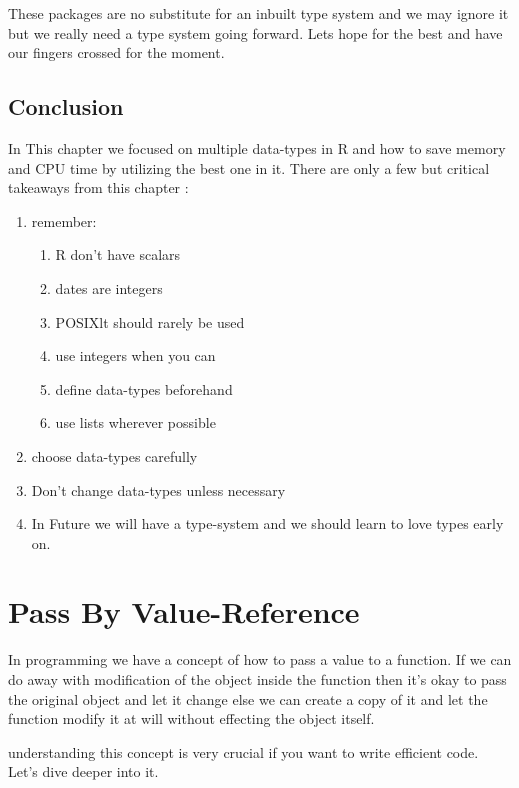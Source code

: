 \documentclass[
]{book}
\begin{document}
These packages are no substitute for an inbuilt type system and we may ignore it but we really need a type system going forward. Lets hope for the best and have our fingers crossed for the moment.

\hypertarget{conclusion-4}{%
\section{Conclusion}\label{conclusion-4}}

In This chapter we focused on multiple data-types in R and how to save memory and CPU time by utilizing the best one in it. There are only a few but critical takeaways from this chapter :

\begin{enumerate}
\def\labelenumi{\arabic{enumi}.}
\item
  remember:

  \begin{enumerate}
  \def\labelenumii{\arabic{enumii}.}
  \item
    R don't have scalars
  \item
    dates are integers
  \item
    POSIXlt should rarely be used
  \item
    use integers when you can
  \item
    define data-types beforehand
  \item
    use lists wherever possible
  \end{enumerate}
\item
  choose data-types carefully
\item
  Don't change data-types unless necessary
\item
  In Future we will have a type-system and we should learn to love types early on.
\end{enumerate}

\hypertarget{reference}{%
\chapter{Pass By Value-Reference}\label{reference}}

In programming we have a concept of how to pass a value to a function. If we can do away with modification of the object inside the function then it's okay to pass the original object and let it change else we can create a copy of it and let the function modify it at will without effecting the object itself.

understanding this concept is very crucial if you want to write efficient code. Let's dive deeper into it.
\end{document}
